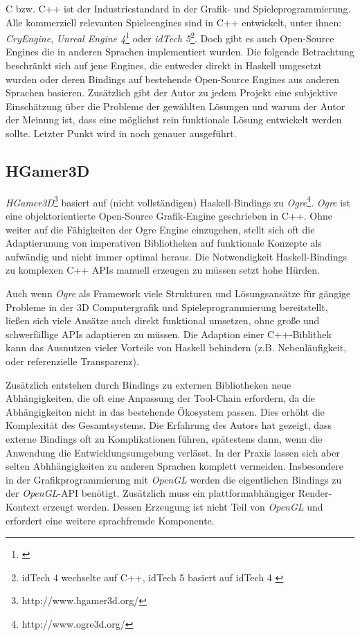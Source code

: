 C bzw. C++ ist der Industriestandard in der Grafik- und Spieleprogrammierung. Alle kommerziell relevanten Spieleengines sind in C++ entwickelt, unter ihnen: \textit{CryEngine}, \textit{Unreal Engine 4}\footnote{\cite{EpicGames2014}} oder \textit{idTech 5}\footnote{idTech 4 wechselte auf C++, idTech 5 basiert auf idTech 4 \parencite{IdSoftware2011}}. Doch gibt es auch Open-Source Engines die in anderen Sprachen implementiert wurden. Die folgende Betrachtung beschränkt sich auf jene Engines, die entweder direkt in Haskell umgesetzt wurden oder deren Bindings auf bestehende Open-Source Engines aus anderen Sprachen basieren. Zusätzlich gibt der Autor zu jedem Projekt eine subjektive Einschätzung über die Probleme der gewählten Lösungen und warum der Autor der Meinung ist, dass eine möglichst rein funktionale Lösung entwickelt werden sollte. Letzter Punkt wird in  noch genauer ausgeführt.

\subsection{HGamer3D}

\textit{HGamer3D}\footnote{http://www.hgamer3d.org/} basiert auf (nicht vollständigen) Haskell-Bindings zu \textit{Ogre}\footnote{http://www.ogre3d.org/}. \textit{Ogre} ist eine objektorientierte Open-Source Grafik-Engine geschrieben in C++. Ohne weiter auf die Fähigkeiten der Ogre Engine einzugehen, stellt sich oft die Adaptierunung von imperativen Bibliotheken auf funktionale Konzepte als aufwändig und nicht immer optimal heraus. Die Notwendigkeit Haskell-Bindings zu komplexen C++ \acsp{API} manuell erzeugen zu müssen setzt hohe Hürden.

Auch wenn \textit{Ogre} als Framework viele Strukturen und Lösungsansätze für gängige Probleme in der 3D Computergrafik und Spieleprogrammierung bereitstellt, ließen sich viele Ansätze auch direkt funktional umsetzen, ohne große und schwerfällige \acsp{API} adaptieren zu müssen. Die Adaption einer C++-Biblithek kann das Ausnutzen vieler Vorteile von Haskell behindern (z.B. Nebenläufigkeit, oder referenzielle Transparenz).

Zusätzlich entstehen durch Bindings zu externen Bibliotheken neue Abhängigkeiten, die oft eine Anpassung der Tool-Chain erfordern, da die Abhängigkeiten nicht in das bestehende Ökosystem passen. Dies erhöht die Komplexität des Gesamtsystems. Die Erfahrung des Autors hat gezeigt, dass externe Bindings oft zu Komplikationen führen, spätestens dann, wenn die Anwendung die Entwicklungsumgebung verlässt. In der Praxis lassen sich aber selten Abhhängigkeiten zu anderen Sprachen komplett vermeiden. Insbesondere in der Grafikprogrammierung mit \textit{OpenGL} werden die eigentlichen Bindings zu der \textit{OpenGL}-API benötigt. Zusätzlich muss ein plattformabhängiger Render-Kontext erzeugt werden. Dessen Erzeugung ist nicht Teil von \textit{OpenGL} und erfordert eine weitere sprachfremde Komponente.

